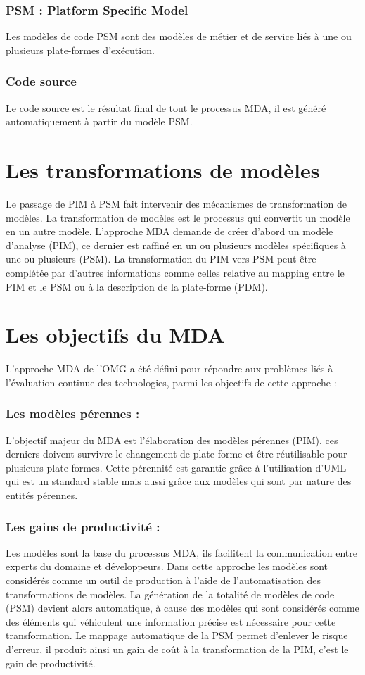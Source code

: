 \documentclass[
10pt, %
a4paper, %
oneside, %
headinclude,footinclude, %
BCOR5mm, %
]{report}
\begin{document}
		\subsubsection{PSM  : Platform Specific Model}
		Les modèles de code PSM sont des modèles de métier et de service liés  à une ou plusieurs plate-formes d’exécution.
		\subsubsection{Code source}
		Le code source est le résultat final de tout le processus MDA, il est généré automatiquement à partir du modèle PSM.
		\section{Les transformations de modèles}
		Le passage de PIM à PSM fait intervenir des mécanismes de transformation de modèles. La transformation de modèles est le processus qui convertit un modèle en un autre modèle.
		L'approche  MDA demande de créer d'abord un modèle d’analyse (PIM), ce dernier est raffiné en un ou plusieurs modèles spécifiques à une ou plusieurs (PSM). 
    La transformation du PIM vers PSM peut être complétée par d’autres informations comme celles relative au mapping entre le PIM et le PSM ou à la description de la plate-forme (PDM).
    
				
    \section{Les objectifs du MDA }
    L’approche MDA de l’OMG a été défini pour répondre aux problèmes liés à l’évaluation continue des technologies, parmi les objectifs de cette approche : 
    \subsubsection{Les modèles pérennes :}
    L’objectif  majeur du MDA est l’élaboration des modèles pérennes (PIM), ces derniers doivent survivre le changement de plate-forme et être réutilisable pour plusieurs plate-formes.
        Cette  pérennité est garantie  grâce à l'utilisation d'UML qui est un standard stable mais aussi grâce  aux modèles qui sont par nature des entités pérennes.
    \subsubsection{Les gains de productivité :}
    Les modèles sont la base du processus MDA, ils facilitent la communication entre experts du domaine et développeurs. Dans cette approche les modèles sont considérés comme un  outil de production à l’aide de l'automatisation des transformations de modèles.
    La génération de la totalité de modèles de  code (PSM) devient alors automatique, à cause des modèles qui sont  considérés comme des  éléments qui véhiculent une information précise est nécessaire pour cette transformation. Le mappage automatique de la PSM permet  d'enlever le risque d'erreur, il produit ainsi un gain de coût à la transformation de la PIM, c’est le gain de productivité. 
\end{document}
